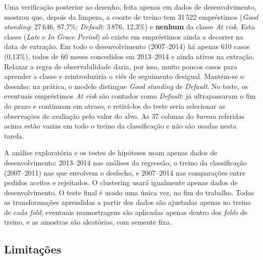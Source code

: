 Uma verificação posterior ao desenho, feita apenas em dados de desenvolvimento, mostrou que, depois da limpeza, a coorte de treino tem 31\,522 empréstimos (\textit{Good standing}: 27\,646, 87,7\%; \textit{Default}: 3\,876, 12,3\%) e \textbf{nenhum} da classe \textit{At risk}. Esta classe (\textit{Late} e \textit{In Grace Period}) só existe em empréstimos ainda a decorrer na data de extração. Em todo o desenvolvimento (2007--2014) há apenas 610 casos (0,13\%), todos de 60 meses concedidos em 2013--2014 e ainda ativos na extração. Relaxar a regra de observabilidade daria, por isso, muito poucos casos para aprender a classe e reintroduziria o viés de seguimento desigual. Mantém-se o desenho: na prática, o modelo distingue \textit{Good standing} de \textit{Default}. No teste, os eventuais empréstimos \textit{At risk} são contados como \textit{Default}: já ultrapassaram o fim do prazo e continuam em atraso, e retirá-los do teste seria selecionar as observações de avaliação pelo valor do alvo. As 37 colunas do \textit{bureau} referidas acima estão vazias em todo o treino da classificação e não são usadas nesta tarefa.

A análise exploratória e os testes de hipóteses usam apenas dados de desenvolvimento: 2013--2014 nas análises da regressão, o treino da classificação (2007--2011) nas que envolvem o desfecho, e 2007--2014 nas comparações entre pedidos aceites e rejeitados. O clustering usará igualmente apenas dados de desenvolvimento. O teste final é usado uma única vez, no fim do trabalho. Todas as transformações aprendidas a partir dos dados são ajustadas apenas no treino de cada \textit{fold}; eventuais reamostragens são aplicadas apenas dentro dos \textit{folds} de treino, e as amostras são aleatórias, com semente fixa.


\subsection{Limitações}

